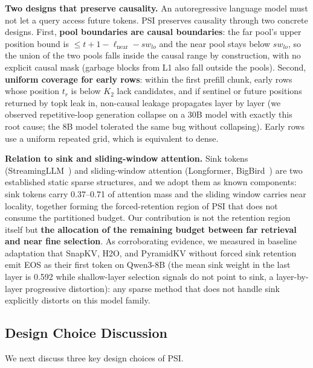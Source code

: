 \documentclass[11pt]{article}
\begin{document}
\textbf{Two designs that preserve causality.} An autoregressive language model must not let a query access future tokens. PSI preserves causality through two concrete designs. First, \textbf{pool boundaries are causal boundaries}: the far pool's upper position bound is $\leq t+1-\ell_{\mathrm{near}}-sw_{lo}$ and the near pool stays below $sw_{lo}$, so the union of the two pools falls inside the causal range by construction, with no explicit causal mask (garbage blocks from L1 also fall outside the pools). Second, \textbf{uniform coverage for early rows}: within the first prefill chunk, early rows whose position $t_r$ is below $K_2$ lack candidates, and if sentinel or future positions returned by topk leak in, non-causal leakage propagates layer by layer (we observed repetitive-loop generation collapse on a 30B model with exactly this root cause; the 8B model tolerated the same bug without collapsing). Early rows use a uniform repeated grid, which is equivalent to dense.

\textbf{Relation to sink and sliding-window attention.} Sink tokens (StreamingLLM~\cite{streamingllm}) and sliding-window attention (Longformer, BigBird~\cite{longformer,bigbird}) are two established static sparse structures, and we adopt them as known components: sink tokens carry 0.37--0.71 of attention mass and the sliding window carries near locality, together forming the forced-retention region of PSI that does not consume the partitioned budget. Our contribution is not the retention region itself but \textbf{the allocation of the remaining budget between far retrieval and near fine selection}. As corroborating evidence, we measured in baseline adaptation that SnapKV, H2O, and PyramidKV without forced sink retention emit EOS as their first token on Qwen3-8B (the mean sink weight in the last layer is 0.592 while shallow-layer selection signals do not point to sink, a layer-by-layer progressive distortion): any sparse method that does not handle sink explicitly distorts on this model family.

\subsection{Design Choice Discussion}

We next discuss three key design choices of PSI.
\end{document}
